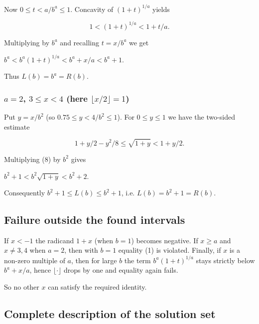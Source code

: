 \documentclass[12pt,a4paper]{article}
\theoremstyle{definition}
\begin{document}
        Now $0 \leq t < a/b^{a} \leq 1$. Concavity of $(1+t)^{1/a}$ yields

        \begin{equation}
            1 < (1+t)^{1/a} < 1 + t/a.
        \end{equation}

        Multiplying by $b^{a}$ and recalling $t = x/b^{a}$ we get

        $b^{a} < b^{a}(1+t)^{1/a} < b^{a} + x/a < b^{a}+1$.

        Thus $L(b)=b^{a}=R(b)$.

        \subsubsection*{$a = 2$, $3 \leq x < 4$ (here $\lfloor x/2\rfloor = 1$)}

        Put $y = x/b^{2}$ (so $0.75 \leq y < 4/b^{2} \leq 1$).
        For $0 \leq y \leq 1$ we have the two-sided estimate

        \begin{equation}
            1 + y/2 - y^{2}/8 \leq \sqrt{1+y} < 1 + y/2.
        \end{equation}

        Multiplying (8) by $b^{2}$ gives

        $b^{2}+1 < b^{2}\sqrt{1+y} < b^{2}+2$.

        Consequently $b^{2}+1 \leq L(b) \leq b^{2}+1$, i.e. $L(b)=b^{2}+1=R(b)$.

        \subsection*{Failure outside the found intervals}

        If $x < -1$ the radicand $1+x$ (when $b=1$) becomes negative.
        If $x \geq a$ and $x \neq 3,4$ when $a=2$, then with $b=1$ equality (1) is violated.
        Finally, if $x$ is a non-zero multiple of $a$, then for large $b$ the term
        $b^{a}(1+t)^{1/a}$ stays strictly below $b^{a}+x/a$, hence
        $\lfloor\cdot\rfloor$ drops by one and equality again fails.

        So no other $x$ can satisfy the required identity.

        \subsection*{Complete description of the solution set}
\end{document}
